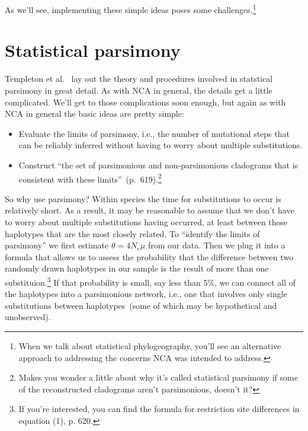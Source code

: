 As we'll see, implementing these simple ideas poses some
challenges.\footnote{When we talk about statistical phylogeography,
  you'll see an alternative approach to addressing the concerns NCA
  was intended to address.}

\section*{Statistical parsimony}

Templeton et al.~\cite{Templeton-etal-1992} lay out the theory and
procedures involved in statstical parsimony in great detail. As with
NCA in general, the details get a little complicated. We'll get to
those complications soon enough, but again as with NCA in general the
basic ideas are pretty simple:

\begin{itemize}

\item Evaluate the limits of parsimony, i.e., the number of mutational
  steps that can be reliably inferred without having to worry about
  multiple substitutions.

\item Construct ``the set of parsimonious and non-parsimonious
  cladograms that is consistent with these limits''~(p.\
  619).\footnote{Makes you wonder a little about why it's called
  statistical parsimony if some of the reconstructed cladograms aren't
  parsimonious, doesn't it?}

\end{itemize}

So why use parsimony? Within species the time for substitutions to
occur is relatively short. As a result, it may be reasonable to assume
that we don't have to worry about multiple substitutions having
occurred, at least between those haplotypes that are the most closely
related. To ``identify the limits of parsimony'' we first estimate
$\theta=4N_e\mu$ from our data. Then we plug it into a formula that
allows us to assess the probability that the difference between two
randomly drawn haplotypes in our sample is the result of more than one
substituion.\footnote{If you're interested, you can find the formula
  for restriction site differences in equation (1), p. 620.} If that
probability is small, say less than 5\%, we can connect all of the
haplotypes into a parsimonious network, i.e., one that involves only
single substitutions between haplotypes~(some of which may be
hypothetical and unobserved).

